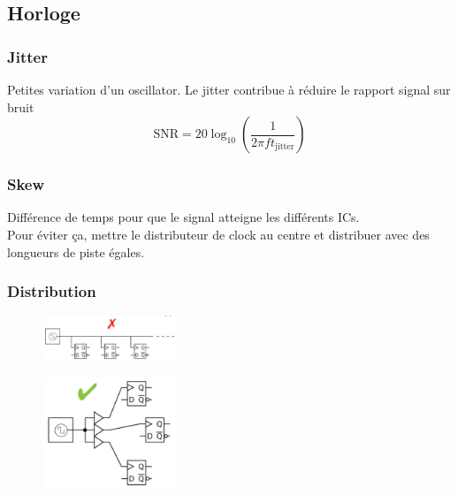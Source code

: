 \documentclass[resume]{subfiles}
\begin{document}
\begin{multicols}{3}
\subsection{Horloge}
\subsubsection{Jitter}
Petites variation d'un oscillator. Le jitter contribue à réduire le rapport signal sur bruit
$$\text{SNR}=20\log_{10}\left(\frac{1}{2\pi ft_\text{jitter}}\right)$$
\subsubsection{Skew}
Différence de temps pour que le signal atteigne les différents ICs.\\
Pour éviter ça, mettre le distributeur de clock au centre et distribuer avec des longueurs de piste égales.
\subsubsection{Distribution}
\begin{figure}[H]
\centering
\includegraphics[width=4.00cm]{img_26.png}
\end{figure}
\begin{figure}[H]
\centering
\includegraphics[width=4.00cm]{img_27.png}
\end{figure}



\end{multicols}
\end{document}
